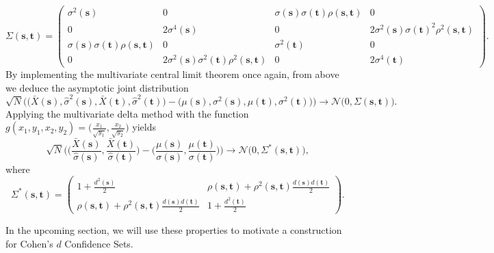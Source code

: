\begin{equation}
\label{eq:17}
\Sigma(\bm{s},\bm{t}) = 
\begin{pmatrix}
	\sigma^{2}(\bm{s}) & 0 & \sigma(\bm{s})\sigma(\bm{t})\rho(\bm{s},\bm{t}) & 0  \\
    0 & 2\sigma^{4}(\bm{s}) & 0 & 2\sigma^{2}(\bm{s})\sigma(\bm{t})^{2}\rho^{2}(\bm{s},\bm{t}) \\
    \sigma(\bm{s})\sigma(\bm{t})\rho(\bm{s},\bm{t}) & 0 & \sigma^{2}(\bm{t}) & 0 \\
   0 & 2\sigma^{2}(\bm{s})\sigma^{2}(\bm{t})\rho^{2}(\bm{s},\bm{t}) & 0 & 2\sigma^{4}(\bm{t})
\end{pmatrix}.
\end{equation}
By implementing the multivariate central limit theorem once again, from above we deduce the asymptotic joint distribution
\begin{equation}
\label{eq:joint_limiting_distribution_again}
\sqrt{N}\Big(\Big(\bar{X}(\bm{s}), \hat{\sigma}^{2}(\bm{s}), \bar{X}(\bm{t}), \hat{\sigma}^{2}(\bm{t}) \Big) - \Big(\mu(\bm{s}),\sigma^{2}(\bm{s}),\mu(\bm{t}),\sigma^{2}(\bm{t})\Big)\Big) \rightarrow \mathcal{N}\Big(0, \Sigma(\bm{s},\bm{t}) \Big).
\end{equation}
Applying the multivariate delta method with the function $g(x_{1}, y_{1}, x_{2}, y_{2}) = \Big( \frac{x_{1}}{\sqrt{y_1}}, \frac{x_{2}}{\sqrt{y_{2}}} \Big)$ yields
\begin{equation}
\label{eq:cohen_limiting_distribtuion_covariance}
\sqrt{N}\Bigg( \Bigg(\frac{\bar{X}(\bm{s})}{\hat{\sigma}(\bm{s})}, \frac{\bar{X}(\bm{t})}{\hat{\sigma}(\bm{t})} \Bigg) - \Bigg(\frac{\mu(\bm{s})}{\sigma(\bm{s})}, \frac{\mu(\bm{t})}{\sigma(\bm{t})} \Bigg) \Bigg) \rightarrow \mathcal{N}\Big(0, \Sigma^{*}(\bm{s},\bm{t}) \Big),
\end{equation}
where
\begin{equation}
\label{eq:cohen_limiting_covariance_matrix}
 \Sigma^{*}(\bm{s},\bm{t}) = \begin{pmatrix}
	1 + \frac{d^{2}({\bm{s}})}{2} & \rho(\bm{s},\bm{t}) + \rho^{2}(\bm{s},\bm{t})\frac{d({\bm{s}})d({\bm{t}})}{2} \\
    \rho(\bm{s},\bm{t}) + \rho^{2}(\bm{s},\bm{t})\frac{d({\bm{s}})d({\bm{t}})}{2} & 1 + \frac{d^{2}({\bm{t}})}{2}
\end{pmatrix}.
\end{equation}

In the upcoming section, we will use these properties to motivate a construction for Cohen's $d$ Confidence Sets.

